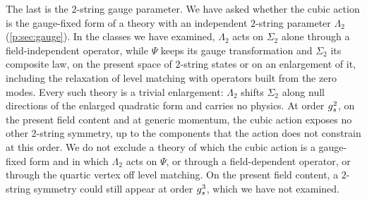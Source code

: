 The last is the $2$-string gauge parameter.
We have asked whether the cubic action is the gauge-fixed form of a theory with an independent $2$-string parameter $\Lambda_2$ (\cref{p:sec:gauge}).
  In the classes we have examined, $\Lambda_2$ acts on $\Sigma_2$ alone through a field-independent operator, while $\Psi$ keeps its gauge transformation and $\Sigma_2$ its composite law, on the present space of $2$-string states or on an enlargement of it, including the relaxation of level matching with operators built from the zero modes.
  Every such theory is a trivial enlargement: $\Lambda_2$ shifts $\Sigma_2$ along null directions of the enlarged quadratic form and carries no physics.
  At order $g_s^2$, on the present field content and at generic momentum, the cubic action exposes no other $2$-string symmetry, up to the components that the action does not constrain at this order.
  We do not exclude a theory of which the cubic action is a gauge-fixed form and in which $\Lambda_2$ acts on $\Psi$, or through a field-dependent operator, or through the quartic vertex off level matching.
  On the present field content, a $2$-string symmetry could still appear at order $g_s^3$, which we have not examined.

